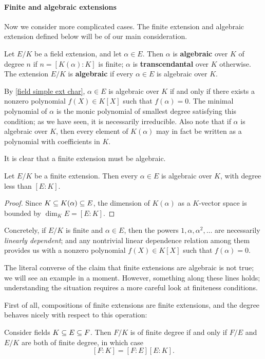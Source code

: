 \paragraph{Finite and algebraic extensions}
Now we consider more complicated cases. The finite extension and algebraic extension defined below will be of our main consideration. 
\begin{definition}
Let $E/K$ be a field extension, and let $\alpha\in E$. Then $\alpha$ is \textbf{algebraic} over $K$ of degree $n$ if $n=[K(\alpha):K]$ is finite; $\alpha$ is \textbf{transcendantal} over $K$ otherwise. The extension $E/K$ is \textbf{algebraic} if every $\alpha\in E$ is algebraic over $K$.
\end{definition}
By \cref{field simple ext char}, $\alpha\in E$ is algebraic over $K$ if and only if there exists a nonzero polynomial $f(X)\in K[X]$ such that $f(\alpha)=0$. The minimal polynomial of $\alpha$ is the monic polynomial of smallest degree satisfying this condition; as we have seen, it is necessarily irreducible. Also note that if $\alpha$ is algebraic over $K$, then every element of $K(\alpha)$ may in fact
be written as a polynomial with coefficients in $K$.\par
It is clear that a finite extension must be algebraic.
\begin{proposition}\label{field extension finite is algebraic}
Let $E/K$ be a finite extension. Then every $\alpha\in E$ is algebraic over $K$, with degree less than $[E:K]$.
\end{proposition}
\begin{proof}
Since $K\subseteq K(\alpha)\subseteq E$, the dimension of $K(\alpha)$ as a $K$-vector space is bounded by $\dim_KE=[E:K]$.
\end{proof}
Concretely, if $E/K$ is finite and $\alpha\in E$, then the powers $1,\alpha,\alpha^2,\dots$ are necessarily \textit{linearly dependent}; and any nontrivial linear dependence relation among them provides us with a nonzero polynomial $f(X)\in K[X]$ such that $f(\alpha)=0$.\par
The literal converse of the claim that finite extensions are algebraic is not true; we will see an example in a moment. However, something along these lines holds; understanding the situation requires a more careful look at finiteness conditions.\par
First of all, compositions of finite extensions are finite extensions, and the degree behaves nicely with respect to this operation:
\begin{proposition}\label{field ext degree multiplicative}
Consider fields $K\subseteq E\subseteq F$. Then $F/K$ is of finite degree if and only if $F/E$ and $E/K$ are both of finite degree, in which case
\[[F:K]=[F:E][E:K].\]
\end{proposition}
